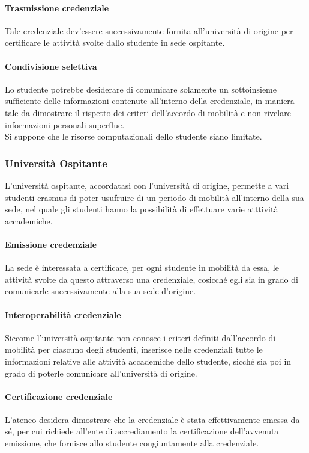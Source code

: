 \documentclass[a4paper,12pt]{article}
\begin{document}
\paragraph{Trasmissione credenziale}Tale credenziale dev'essere successivamente fornita all'università di origine per certificare le attività svolte dallo studente in sede ospitante. 
\paragraph{Condivisione selettiva} Lo studente potrebbe desiderare di comunicare solamente un sottoinsieme sufficiente delle informazioni contenute all'interno della credenziale, in maniera tale da dimostrare il rispetto dei criteri dell'accordo di mobilità e non rivelare informazioni personali superflue.
\\[0.5em] Si suppone che le risorse computazionali dello studente siano limitate. 

\subsubsection{Università Ospitante}
L'università ospitante, accordatasi con l'università di origine, permette a vari studenti erasmus di poter usufruire di un periodo di mobilità all'interno della sua sede, nel quale gli studenti hanno la possibilità di effettuare varie atttività accademiche.
\paragraph{Emissione credenziale} La sede è interessata a certificare, per ogni studente in mobilità da essa, le attività svolte da questo attraverso una credenziale, cosicché egli sia in grado di comunicarle successivamente alla sua sede d'origine.
\paragraph{Interoperabilità credenziale} Siccome l'università ospitante non conosce i criteri definiti dall'accordo di mobilità per ciascuno degli studenti, inserisce nelle credenziali tutte le informazioni relative alle attività accademiche dello studente, sicché sia poi in grado di poterle comunicare all'università di origine.
\paragraph{Certificazione credenziale}  L'ateneo desidera dimostrare che la credenziale è stata effettivamente emessa da sé, per cui richiede all'ente di accrediamento la certificazione dell'avvenuta emissione, che fornisce allo studente congiuntamente alla credenziale.
\end{document}
